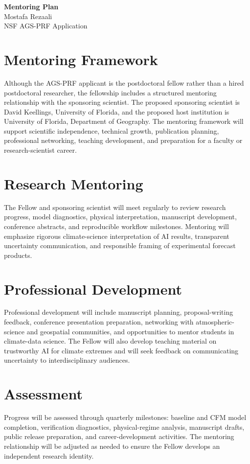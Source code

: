 \documentclass[11pt,letterpaper]{article}
\begin{document}
\begin{center}
{\Large\bfseries Mentoring Plan}\\[0.05in]
{\normalsize Mostafa Rezaali}\\
{\normalsize NSF AGS-PRF Application}
\end{center}
\vspace{-0.08in}
\section*{Mentoring Framework}
Although the AGS-PRF applicant is the postdoctoral fellow rather than a hired postdoctoral researcher, the fellowship includes a structured mentoring relationship with the sponsoring scientist. The proposed sponsoring scientist is David Keellings, University of Florida, and the proposed host institution is University of Florida, Department of Geography. The mentoring framework will support scientific independence, technical growth, publication planning, professional networking, teaching development, and preparation for a faculty or research-scientist career.

\section*{Research Mentoring}
The Fellow and sponsoring scientist will meet regularly to review research progress, model diagnostics, physical interpretation, manuscript development, conference abstracts, and reproducible workflow milestones. Mentoring will emphasize rigorous climate-science interpretation of AI results, transparent uncertainty communication, and responsible framing of experimental forecast products.

\section*{Professional Development}
Professional development will include manuscript planning, proposal-writing feedback, conference presentation preparation, networking with atmospheric-science and geospatial communities, and opportunities to mentor students in climate-data science. The Fellow will also develop teaching material on trustworthy AI for climate extremes and will seek feedback on communicating uncertainty to interdisciplinary audiences.

\section*{Assessment}
Progress will be assessed through quarterly milestones: baseline and CFM model completion, verification diagnostics, physical-regime analysis, manuscript drafts, public release preparation, and career-development activities. The mentoring relationship will be adjusted as needed to ensure the Fellow develops an independent research identity.
\end{document}
